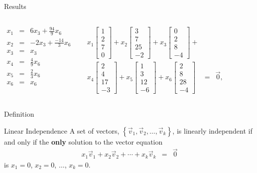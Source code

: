 \documentclass[svgnames,table,,aspectratio=169]{beamer}
\newcommand{\columnVector}[1]{%
  \left[
    \begin{array}{r}
    #1                           
    \end{array}
  \right]
}
\begin{document}
\begin{frame}{Results}

  \begin{columns}

    \begin{eqnarray*}
      x_1 & = & 6 x_3 +  \frac{94}{9} x_6 \\
      x_2 & = & -2 x_3 + \frac{-14}{3} x_6 \\
      x_3 & = & x_3 \\
      x_4 & = & \frac{4}{9} x_6 \\
      x_5 & = & \frac{2}{3} x_6 \\
      x_6 & = & x_6
    \end{eqnarray*}


    \begin{eqnarray*}
      x_1 \columnVector{ 1 \\   2 \\   7 \\   0} + 
      x_2 \columnVector{3  \\  7  \\  25 \\  -2} +
      x_3 \columnVector{0  \\  2  \\  8  \\ -4} +  & & \\
      x_4 \columnVector{2  \\  4  \\ 17  \\ -3} + 
      x_5 \columnVector{1  \\  3  \\ 12  \\ -6} +
      x_6 \columnVector{2  \\  8  \\ 28  \\ -4}
      & = &
    \vec{0},
  \end{eqnarray*}

  \end{columns}
  
\end{frame}

\begin{frame}{Definition}

  \begin{block}{Linear Independence}
    A set of vectors,
    $\left\{ \vec{v}_1, \vec{v}_2, \ldots , \vec{v}_k \right\}$, is
    linearly independent if and only if the \textbf{only} solution to
    the vector equation
    \begin{eqnarray*}
      x_1 \vec{v}_1 + x_2 \vec{v}_2 +  \cdots + x_k \vec{v}_k
      & = & \vec{0}
    \end{eqnarray*}
    is $x_1=0$, $x_2=0$, $\ldots$, $x_k=0$.
  \end{block}
  
  
\end{frame}
\end{document}
